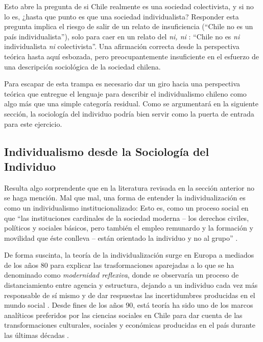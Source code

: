 \documentclass[12pt,twoside]{templates/facsothesis}
\begin{document}
Esto abre la pregunta de si Chile realmente es una sociedad colectivista, y si no lo es, ¿hasta que punto es que una sociedad individualista? Responder esta pregunta implica el riesgo de salir de un relato de insuficiencia (``Chile no es un país individualista''), solo para caer en un relato del \emph{ni, ni} \citep{martuccelli2010}: ``Chile no es \emph{ni} individualista \emph{ni} colectivista''. Una afirmación correcta desde la perspectiva teórica hasta aquí esbozada, pero preocupantemente insuficiente en el esfuerzo de una descripción sociológica de la sociedad chilena.

Para escapar de esta trampa es necesario dar un giro hacia una perspectiva teórica que entregue el lenguaje para describir el individualismo chileno como algo más que una simple categoría residual. Como se argumentará en la siguiente sección, la sociología del individuo podría bien servir como la puerta de entrada para este ejercicio.

\hypertarget{individualismo-desde-la-sociologuxeda-del-individuo}{%
\subsection{Individualismo desde la Sociología del Individuo}\label{individualismo-desde-la-sociologuxeda-del-individuo}}

Resulta algo sorprendente que en la literatura revisada en la sección anterior no se haga mención. Mal que mal, una forma de entender la individualización es como un individualismo institucionalizado: Esto es, como un proceso social en que ``las instituciones cardinales de la sociedad moderna -- los derechos civiles, políticos y sociales básicos, pero también el empleo remunardo y la formación y movilidad que éste conlleva -- están orientado la individuo y no al grupo'' \citep[p.~32]{beck2003}.

De forma suscinta, la teoría de la individualización surge en Europa a mediados de los años 80 para explicar las trasformaciones aparejadas a lo que se ha denominado como \emph{modernidad reflexiva}, donde se observaría un proceso de distanciamiento entre agencia y estructura, dejando a un individuo cada vez más responsable de sí mismo y de dar respuestas las incertidumbres producidas en el mundo social \citep{beck2003}. Desde fines de los años 90, está teoría ha sido uno de los marcos analíticos preferidos por las ciencias sociales en Chile para dar cuenta de las transformaciones culturales, sociales y económicas producidas en el país durante las últimas décadas \citep{yopo2013}.
\end{document}
